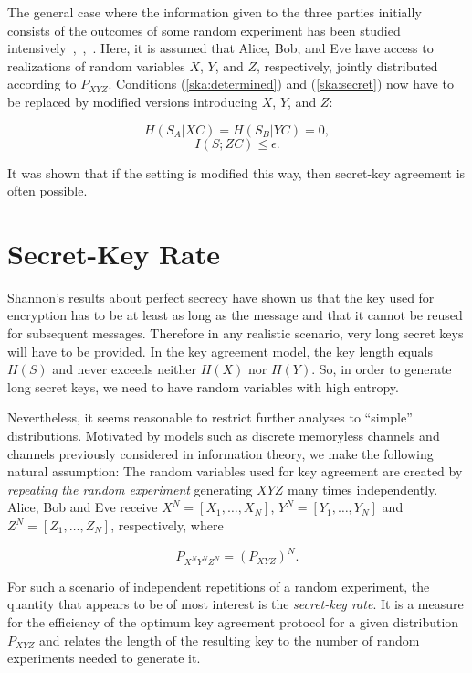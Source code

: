 \documentclass[a4paper, twoside, openany]{report}
\newcommand{\eps}{\epsilon}
\theoremstyle{plain}
\theoremstyle{definition}
\begin{document}
The general case where the information given to the three parties initially consists of the outcomes of some random experiment has been studied intensively~\cite{ka},\, \cite{ittrans},\, \cite{diss}. Here, it is assumed that Alice, Bob, and Eve have access to realizations of random variables $X$, $Y$, and $Z$, respectively, jointly distributed according to $P_{XYZ}$. Conditions (\ref{ska:determined}) and (\ref{ska:secret}) now have to be replaced by modified versions introducing $X$, $Y$, and $Z$:

\begin{equation} \label{ska:determinedByXY}
H(S_A|XC) = H(S_B|YC) = 0,
\end{equation}
\begin{equation} \label{ska:secureWrtZ}
I(S;ZC) \leq \eps.
\end{equation}

It was shown that if the setting is modified this way, then secret-key agreement is often possible.


\section{Secret-Key Rate}

Shannon's results about perfect secrecy have shown us that the key used for encryption has to be at least as long as the message and that it cannot be reused for subsequent messages. Therefore in any realistic scenario, very long secret keys will have to be provided. In the key agreement model, the key length equals $H(S)$ and never exceeds neither $H(X)$ nor $H(Y)$. So, in order to generate long secret keys, we need to have random variables with high entropy.

Nevertheless, it seems reasonable to restrict further analyses to ``simple'' distributions. Motivated by models such as discrete memoryless channels and channels previously considered in information theory, we make the following natural assumption: The random variables used for key agreement are created by \emph{repeating the random experiment} generating $XYZ$ many times independently. Alice, Bob and Eve receive $X^N = [X_1,\ldots,X_N]$, $Y^N = [Y_1,\ldots,Y_N]$ and $Z^N = [Z_1,\ldots,Z_N]$, respectively, where

\[P_{X^N Y^N Z^N} = {(P_{XYZ})}^N.\]

For such a scenario of independent repetitions of a random experiment, the quantity that appears to be of most interest is the \emph{secret-key rate}. It is a measure for the efficiency of the optimum key agreement protocol for a given distribution $P_{XYZ}$ and relates the length of the resulting key to the number of random experiments needed to generate it.
\end{document}
